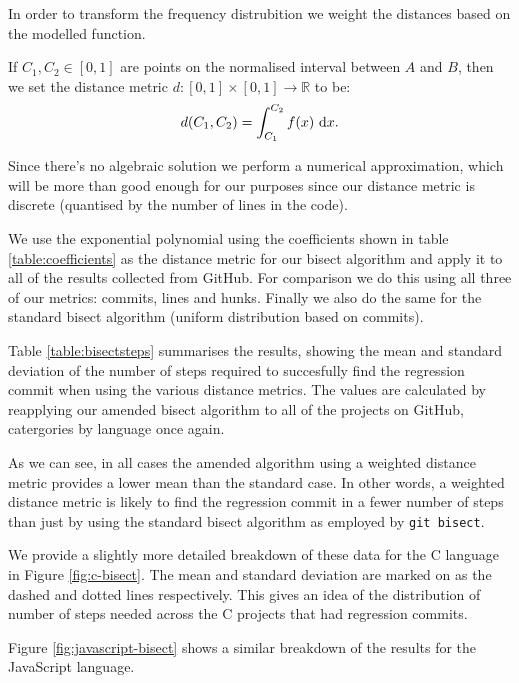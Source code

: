 \documentclass[pdflatex, sn-mathphys, referee]{sn-jnl}%
\theoremstyle{thmstyleone}%
\theoremstyle{thmstyletwo}%
\theoremstyle{thmstylethree}%
\def\code{\tt}
\def\R{\mathbb{R}}
\theoremstyle{thmstyleone}
\begin{document}
In order to transform the frequency distrubition we weight the distances based on the modelled function.

If $C_1, C_2 \in [0, 1]$ are points on the normalised interval between $A$ and $B$, then we set the distance metric $d : [0, 1] \times [ 0, 1 ] \to \R$ to be:
$$
d(C_1, C_2) = \int_{C_1}^{C_2} f(x) \ {\rm d}x .
$$

Since there's no algebraic solution we perform a numerical approximation, which will be more than good enough for our purposes since our distance metric is discrete (quantised by the number of lines in the code).

We use the exponential polynomial using the coefficients shown in table \ref{table:coefficients} as the distance metric for our bisect algorithm and apply it to all of the results collected from GitHub. For comparison we do this using all three of our metrics: commits, lines and hunks. Finally we also do the same for the standard bisect algorithm (uniform distribution based on commits).

Table \ref{table:bisectsteps} summarises the results, showing the mean and standard deviation of the number of steps required to succesfully find the regression commit when using the various distance metrics. The values are calculated by reapplying our amended bisect algorithm to all of the projects on GitHub, catergories by language once again.

As we can see, in all cases the amended algorithm using a weighted distance metric provides a lower mean than the standard case. In other words, a weighted distance metric is likely to find the regression commit in a fewer number of steps than just by using the standard bisect algorithm as employed by {\code git bisect}.

We provide a slightly more detailed breakdown of these data for the C language in Figure \ref{fig:c-bisect}. The mean and standard deviation are marked on as the dashed and dotted lines respectively. This gives an idea of the distribution of number of steps needed across the C projects that had regression commits.

Figure \ref{fig:javascript-bisect} shows a similar breakdown of the results for the JavaScript language.
\end{document}
